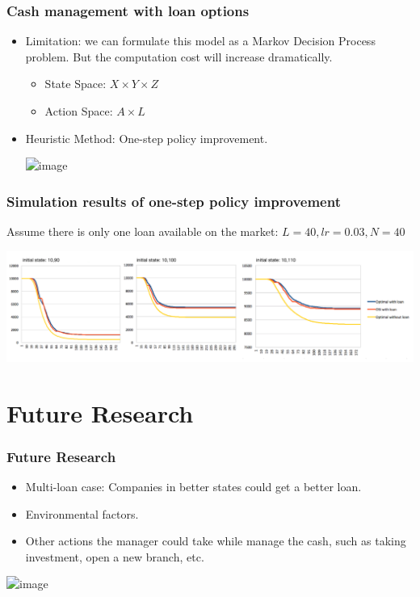\documentclass{beamer}
\begin{document}
\begin{frame}
\frametitle{Cash management with loan options}
\begin{itemize}
\item<2-> Limitation: we can formulate this model as a Markov Decision Process problem. But the computation cost will increase dramatically.
\begin{itemize}
\item<3-> State Space: $X \times Y \times Z$
\item<3-> Action Space: $A \times L $
\end{itemize}
\item<4->  Heuristic Method: One-step policy improvement.


\includegraphics<4->[scale=.3]{heuristic.png}

\end{itemize}
\end{frame}

\begin{frame}
\frametitle{Simulation results of one-step policy improvement}
Assume there is only one loan available on the market: $L = 40, lr = 0.03, N = 40$


\includegraphics[scale=.22]{oneStep}
\end{frame}




\section{Future Research}
\begin{frame}
\frametitle{Future Research}
\begin{itemize}
\item Multi-loan case: Companies in better states could get a better loan.
\item Environmental factors.
\item Other actions the manager could take while manage the cash, such as taking investment, open a new branch, etc.
\end{itemize}
\includegraphics<4->[scale=.18]{Holistic.png}
\end{frame}
\end{document}

